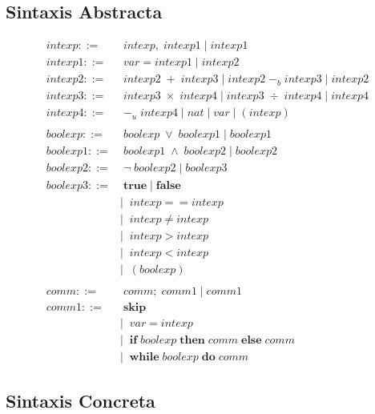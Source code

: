 \documentclass[11pt, fleqn]{article}
\begin{document}
\subsection*{Sintaxis Abstracta}
\begin{align*}
intexp ::=& \; intexp, \; intexp1 \; \vert \; intexp1 \\
intexp1 ::=& \; var = intexp1 \; \vert \; intexp2 \\
intexp2 ::=& \; intexp2 \; +  \; intexp3 \; \vert \; intexp2 \; -_b  \; intexp3 \; \vert \; intexp2\\
intexp3 ::=& \; intexp3 \; \times  \; intexp4 \; \vert \; intexp3 \; \div  \; intexp4 \; \vert \; intexp4\\
intexp4 ::=& \; -_u \; intexp4 \; \vert \; nat \; \vert \; var \; \vert \; (intexp) \\
& \\
boolexp ::=& \; boolexp \; \lor \; boolexp1 \; \vert \; boolexp1 \\
boolexp1 ::=& \; boolexp1 \; \land \; boolexp2 \; \vert \; boolexp2 \\
boolexp2 ::=& \; \neg \; boolexp2 \; \vert \; boolexp3 \\
boolexp3 ::=& \; \textbf{true} \; \vert \; \textbf{false} \\
            &| \;\; intexp == intexp \\
            &| \;\; intexp \neq intexp \\
            &| \;\; intexp > intexp \\
            &| \;\; intexp < intexp \\
            &| \;\; (boolexp) \\
&\\
comm ::=& \; comm; \; comm1 \; \vert \; comm1 \\
comm1 ::=& \; \textbf{skip} \\
         &| \;\; var = intexp \\
         &| \;\; \textbf{if} \; boolexp \; \textbf{then} \; comm \; \textbf{else} \; comm \\
         &| \; \; \textbf{while} \; boolexp \; \textbf{do} \; comm
\end{align*}


\subsection*{Sintaxis Concreta}
\end{document}
